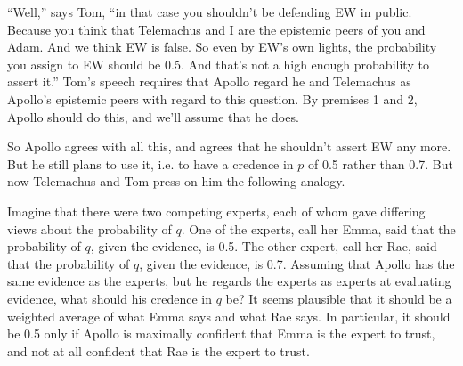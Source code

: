 ``Well,'' says Tom, ``in that case you shouldn't be defending EW in public. Because you think that Telemachus and I are the epistemic peers of you and Adam. And we think EW is false. So even by EW's own lights, the probability you assign to EW should be 0.5. And that's not a high enough probability to assert it.'' Tom's speech requires that Apollo regard he and Telemachus as Apollo's epistemic peers with regard to this question. By premises 1 and 2, Apollo should do this, and we'll assume that he does.

So Apollo agrees with all this, and agrees that he shouldn't assert EW any more. But he still plans to use it, i.e. to have a credence in $p$ of 0.5 rather than 0.7. But now Telemachus and Tom press on him the following analogy.

Imagine that there were two competing experts, each of whom gave differing views about the probability of $q$. One of the experts, call her Emma, said that the probability of $q$, given the evidence, is 0.5. The other expert, call her Rae, said that the probability of $q$, given the evidence, is 0.7. Assuming that Apollo has the same evidence as the experts, but he regards the experts as experts at evaluating evidence, what should his credence in $q$ be? It seems plausible that it should be a weighted average of what Emma says and what Rae says. In particular, it should be 0.5 only if Apollo is maximally confident that Emma is the expert to trust, and not at all confident that Rae is the expert to trust.


